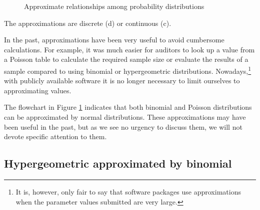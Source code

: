 \begin{figure} 
\begin{center}
\caption{Approximate relationships among probability distributions}
\label{fig:H2Benaderingen}

\end{center}
\end{figure}

The approximations are discrete (d) or continuous (c). 

\bigskip
In the past, approximations have been very useful to avoid cumbersome calculations. For example, it was much easier for auditors to look up a value from a Poisson table to calculate the required sample size or evaluate the results of a sample compared to using binomial or hypergeometric distributions. Nowadays,\footnote{It is, however, only fair to say that software packages use approximations when the parameter values submitted are very large.} with publicly available software it is no longer necessary to limit ourselves to approximating values. 

The flowchart in Figure \ref{fig:H2Benaderingen} indicates that both  binomial and Poisson distributions can be approximated by normal distributions. These approximations may have been useful in the past, but as we see no urgency to discuss them, we will not devote specific attention to them.

\subsection{Hypergeometric approximated by binomial} %
\label{sub:hypergeometric_approximated_by_binomial}

\begin{figure}[htbp]
  \centering
\end{figure}

